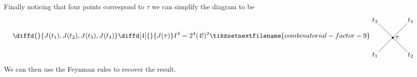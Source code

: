         Finally noticing that four points correspond to \(\tau\) we can simplify the diagram to be
        \begin{equation}
            \diffd{}{J(t_1),J(t_2),J(t_3),J(t_4)}\diffd[4]{}{J(\tau)} I^4 = 2^4(4!)^2
            \tikzsetnextfilename{combinatorial-factor-9}
            \begin{tikzpicture}[baseline=0.75cm]
                \draw (0, 0) -- (1.5, 1.5);
                \draw (0, 1.5) -- (1.5, 0);
                \fill (0.75, 0.75) circle [radius = 0.05] node[right] {\(\tau\)};
                \node[below left] at (0.1, 0.1) {\(t_1\)};
                \node[above left] at (0.1, 1.4) {\(t_3\)};
                \node[below right] at (1.4, 0.1) {\(t_2\)};
                \node[above right] at (1.4, 1.4) {\(t_4\)};
            \end{tikzpicture}
        \end{equation}
        We can then use the Feynman rules to recover the result.